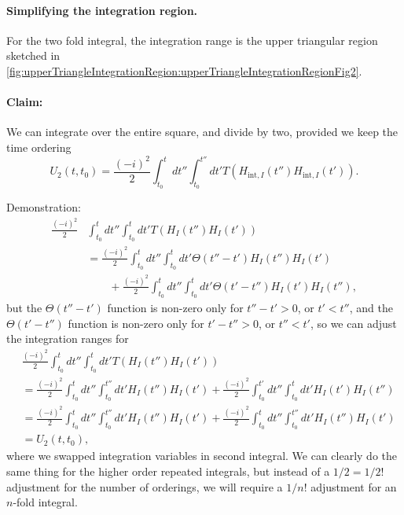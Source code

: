 \paragraph{Simplifying the integration region.}

For the two fold integral, the integration range is the upper triangular region sketched in \cref{fig:upperTriangleIntegrationRegion:upperTriangleIntegrationRegionFig2}.

\paragraph{Claim:} We can integrate over the entire square, and divide by two, provided we keep the time ordering
\begin{equation}\label{eqn:qftLecture13:1040}
U_2(t, t_0)
= \frac{(-i )^2}{2}
\int_{t_0}^t dt''
\int_{t_0}^{t''}
dt'
T(H_{\text{int}, I}(t'') H_{\text{int}, I}(t') ).
\end{equation}

Demonstration:
\begin{equation}\label{eqn:qftLecture13:1100}
\begin{aligned}
\frac{(-i)^2}{2}
&\int_{t_0}^t dt''
\int_{t_0}^t dt'
T( H_I(t'') H_I(t') ) \\
&=
\frac{(-i)^2}{2}
\int_{t_0}^t dt''
\int_{t_0}^t dt'
\Theta(t''- t')
H_I(t'') H_I(t') \\
&\qquad +
\frac{(-i)^2}{2}
\int_{t_0}^t dt''
\int_{t_0}^t dt'
\Theta(t'- t'')
H_I(t') H_I(t''),
\end{aligned}
\end{equation}
but the \( \Theta(t'' - t') \) function is non-zero only for \( t'' - t' > 0 \), or \( t' < t'' \), and the
\( \Theta(t' - t'') \) function is non-zero only for \( t' - t'' > 0 \), or \( t'' < t' \), so we can adjust the integration ranges for
\begin{equation}\label{eqn:qftLecture13:1260}
\begin{aligned}
&\frac{(-i)^2}{2}
\int_{t_0}^t dt''
\int_{t_0}^t dt'
T( H_I(t'') H_I(t') ) \\
&=
\frac{(-i)^2}{2}
\int_{t_0}^t dt''
\int_{t_0}^{t''} dt'
H_I(t'') H_I(t')
+
\frac{(-i)^2}{2}
\int_{t_0}^{t'} dt''
\int_{t_0}^t dt'
H_I(t') H_I(t'') \\
&=
\frac{(-i)^2}{2}
\int_{t_0}^t dt''
\int_{t_0}^{t''} dt'
H_I(t'') H_I(t')
+
\frac{(-i)^2}{2}
\int_{t_0}^t dt''
\int_{t_0}^{t''} dt'
H_I(t'') H_I(t') \\
&=
U_2(t, t_0),
\end{aligned}
\end{equation}
where we swapped integration variables in second integral.  We can clearly do the same thing for the higher order repeated integrals, but instead of a \(1/2 = 1/2!\) adjustment for the number of orderings, we will require a \( 1/n! \) adjustment for an \( n \)-fold integral.

